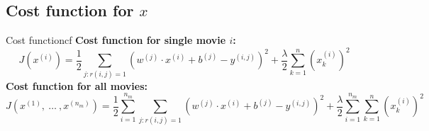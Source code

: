 \subsection*{Cost function for $x$}
\begin{dfnbox}{Cost function}{cf}
    \textbf{Cost function for single movie $i$:}
    \begin{equation}
        J(x^{(i)}) = \frac{1}{2} \sum_{j:r(i,j)=1} \left( w^{(j)} \cdot x^{(i)} + b^{(j)} - y^{(i,j)} \right)^2 + 
        \frac{\lambda}{2} \sum_{k=1}^{n} (x_k^{(i)})^2
    \end{equation}
    \textbf{Cost function for all movies:}
    \begin{equation}
        J\left(x^{(1)}, \ \ldots \ ,x^{(n_m)}\right) = 
        \frac{1}{2} \sum_{i=1}^{n_m} \sum_{j:r(i,j)=1}
         \left( w^{(j)} \cdot x^{(i)} + b^{(j)} - y^{(i,j)} \right)^2 + 
         \frac{\lambda}{2} \sum_{i=1}^{n_m} \sum_{k=1}^{n} (x_k^{(i)})^2
    \end{equation}
\end{dfnbox}


